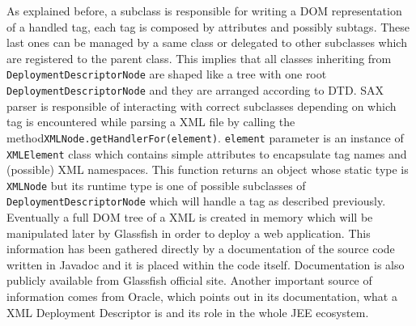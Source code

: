 As explained before, a subclass is responsible for writing a DOM representation of a handled tag, each tag is composed by attributes and possibly subtags. These last ones can be managed by a same class or delegated to other subclasses which are registered to the parent class. \newline This implies that all classes inheriting from \texttt{DeploymentDescriptorNode} are shaped like a tree with one root \texttt{DeploymentDescriptorNode} and they are arranged according to DTD. \newline SAX parser is responsible of interacting with correct subclasses depending on which tag is encountered while parsing a XML file by calling the method\newline\texttt{XMLNode.getHandlerFor(element)}. \texttt{element} parameter is an instance of \texttt{XMLElement} class which contains simple attributes to encapsulate tag names and (possible) XML namespaces. This function returns an object whose static type is \texttt{XMLNode} but its runtime type is one of possible subclasses of \newline \texttt{DeploymentDescriptorNode} which will handle a tag as described previously. \newline
Eventually a full DOM tree of a XML is created in memory which will be manipulated later by Glassfish in order to deploy a web application. \newline
This information has been gathered directly by a documentation of the source code written in Javadoc and it is placed within the code itself. Documentation is also publicly available from Glassfish official site. Another important source of information comes from Oracle, which points out in its documentation, what a XML Deployment Descriptor is and its role in the whole JEE ecosystem.